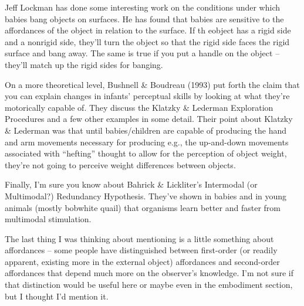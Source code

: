Jeff Lockman has done some interesting work on the conditions under
which babies bang objects on surfaces.  He has found that babies are
sensitive to the affordances of the object in relation to the surface.
If th eobject has a rigid side and a nonrigid side, they'll turn the
object so that the rigid side faces the rigid surface and bang away.
The same is true if you put a handle on the object -- they'll match up
the rigid sides for banging.



On a more theoretical level, Bushnell \& Boudreau (1993) put forth the
claim that you can explain changes in infants' perceptual skills by
looking at what they're motorically capable of.  They discuss the
Klatzky \& Lederman Exploration Procedures and a few other examples in
some detail.  Their point about Klatzky \& Lederman was that until
babies/children are capable of producing the hand and arm movements
necessary for producing e.g., the up-and-down movements associated
with ``hefting'' thought to allow for the perception of object weight,
they're not going to perceive weight differences between objects.

Finally, I'm sure you know about Bahrick \& Lickliter's Intermodal (or
Multimodal?) Redundancy Hypothesis.  They've shown in babies and in
young animals (mostly bobwhite quail) that organisms learn better and
faster from multimodal stimulation.



The last thing I was thinking about mentioning is a little something
about affordances -- some people have distinguished between
first-order (or readily apparent, existing more in the external
object) affordances and second-order affordances that depend much more
on the observer's knowledge.  I'm not sure if that distinction would
be useful here or maybe even in the embodiment section, but I thought
I'd mention it.
